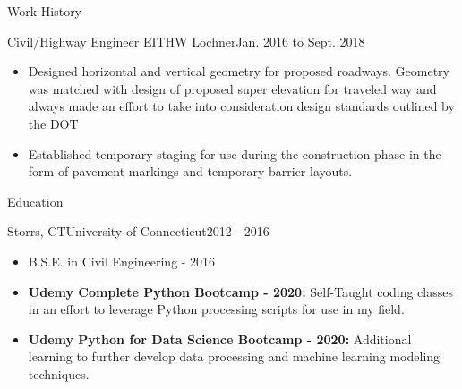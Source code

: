 \documentclass[]{mcdowellcv}
\begin{document}
\begin{cvsection}{Work History}
		\begin{cvsubsection}{Civil/Highway Engineer EIT}{HW Lochner}{Jan. 2016 to Sept. 2018}
			\begin{itemize}
				\item Designed horizontal and vertical geometry for proposed roadways. Geometry was matched with design of proposed super elevation for traveled way and always made an effort to take into consideration design standards outlined by the DOT
				\item Established temporary staging for use during the construction phase in the form of pavement markings and temporary barrier layouts.
			\end{itemize}
		\end{cvsubsection}
	\end{cvsection}

    	\begin{cvsection}{Education}
		\begin{cvsubsection}{Storrs, CT}{University of Connecticut}{2012 - 2016}
			\begin{itemize}
				\item B.S.E. in Civil Engineering - 2016
                    \item \textbf{Udemy Complete Python Bootcamp - 2020:} Self-Taught coding classes in an effort to leverage Python processing scripts for use in my field. 
                    \item \textbf{Udemy Python for Data Science Bootcamp - 2020:} Additional learning to further develop data processing and machine learning modeling techniques. 
                    
			\end{itemize}
		\end{cvsubsection}
	\end{cvsection}
	
\end{document}
